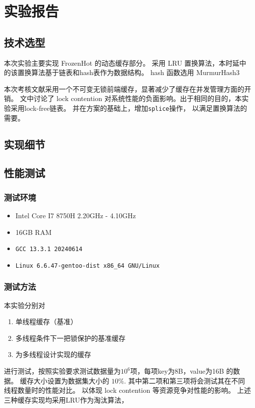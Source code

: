 \maketitle

\section{实验报告}

\subsection{技术选型}

本次实验主要实现 FrozenHot\cite{qiu_frozenhot_2023} 的动态缓存部分。
采用 LRU 置换算法，本时延中的该置换算法基于链表和hash表作为数据结构。
hash 函数选用 MurmurHash3 \cite{SMHasher}

本次考核文献\cite{qiu_frozenhot_2023}采用一个不可变无锁前端缓存，显著减少了缓存在并发管理方面的开销。
文中讨论了 lock contention 对系统性能的负面影响。出于相同的目的，本实验采用lock-free链表。
并在\cite{timothy_l_harris_pragmatic_2001}方案的基础上，增加\verb|splice|操作，
以满足置换算法的需要。

\subsection{实现细节}


\subsection{性能测试}

\subsubsection{测试环境}

\begin{itemize}
    \item Intel Core I7 8750H 2.20GHz - 4.10GHz
    \item 16GB RAM
    \item \verb|GCC 13.3.1 20240614|
    \item \verb|Linux 6.6.47-gentoo-dist x86_64 GNU/Linux|
\end{itemize}

\subsubsection{测试方法}

本实验分别对
\begin{enumerate}
    \item 单线程缓存（基准）
    \item 多线程条件下一把锁保护的基准缓存
    \item 为多线程设计实现的缓存
\end{enumerate}
进行测试，按照实验要求测试数据量为$10^6$项，每项key为8B，value为16B 的数据。
缓存大小设置为数据集大小的 $10\%$.
其中第二项和第三项将会测试其在不同线程数量时的性能对比。
以体现 lock contention 等资源竞争对性能的影响。
上述三种缓存实现均采用LRU作为淘汰算法，

